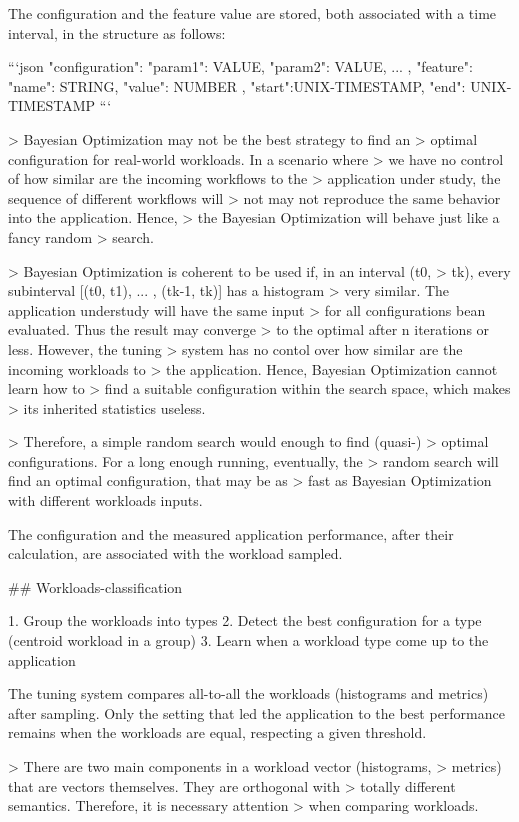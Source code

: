 The configuration and the feature value are stored, both associated
with a time interval, in the structure as follows:

```json
{
  "configuration": { "param1": VALUE, "param2": VALUE, ...  },
  "feature": { "name": STRING, "value": NUMBER },
  "start":UNIX-TIMESTAMP,
  "end": UNIX-TIMESTAMP
}
```

> Bayesian Optimization may not be the best strategy to find an
> optimal configuration for real-world workloads. In a scenario where
> we have no control of how similar are the incoming workflows to the
> application under study, the sequence of different workflows will
> not may not reproduce the same behavior into the application. Hence,
> the Bayesian Optimization will behave just like a fancy random
> search.

> Bayesian Optimization is coherent to be used if, in an interval (t0,
> tk), every subinterval [(t0, t1), ... , (tk-1, tk)] has a histogram
> very similar. The application understudy will have the same input
> for all configurations bean evaluated. Thus the result may converge
> to the optimal after n iterations or less. However, the tuning
> system has no contol over how similar are the incoming workloads to
> the application. Hence, Bayesian Optimization cannot learn how to
> find a suitable configuration within the search space, which makes
> its inherited statistics useless.

> Therefore, a simple random search would enough to find (quasi-)
> optimal configurations. For a long enough running, eventually, the
> random search will find an optimal configuration, that may be as
> fast as Bayesian Optimization with different workloads inputs.

The configuration and the measured application performance, after
their calculation, are associated with the workload sampled.

## Workloads-classification

1. Group the workloads into types
2. Detect the best configuration for a type (centroid workload in a group)
3. Learn when a workload type come up to the application

The tuning system compares all-to-all the workloads (histograms and
metrics) after sampling. Only the setting that led the application to
the best performance remains when the workloads are equal, respecting
a given threshold.

> There are two main components in a workload vector (histograms,
> metrics) that are vectors themselves. They are orthogonal with
> totally different semantics. Therefore, it is necessary attention
> when comparing workloads.

